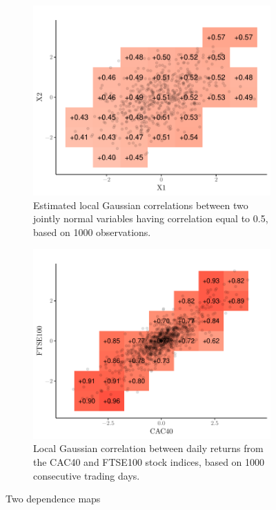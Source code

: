 \begin{figure}[t]
    \centering
    \begin{subfigure}[t]{0.48\textwidth}
      \includegraphics[width=\textwidth]{gaussian-example}
      \caption{Estimated local Gaussian correlations between two  jointly normal variables having correlation equal to 0.5, based on 1000 observations.}
    \end{subfigure}
    \begin{subfigure}[t]{0.48\textwidth}
      \includegraphics[width=\textwidth]{returns-example}
      \caption{Local Gaussian correlation between daily returns from the CAC40 and FTSE100 stock indices, based on 1000 consecutive trading days.}
    \end{subfigure}
    \caption{Two dependence maps}
    \label{fig:initial-example}
  \end{figure}
  
